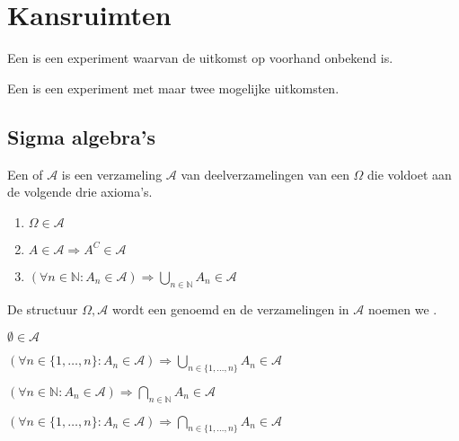 \documentclass[main.tex]{subfiles}
\begin{document}
\chapter{Kansruimten}
\label{cha:kansruimten}

\begin{de}
  Een  is een experiment waarvan de uitkomst op voorhand onbekend is.
\end{de}

\begin{de}
  Een  is een experiment met maar twee mogelijke uitkomsten.
\end{de}
\section{Sigma algebra's}

\begin{de}
  Een  of  $\mathcal{A}$ is een verzameling $\mathcal{A}$ van deelverzamelingen van een  $\Omega$ die voldoet aan de volgende drie axioma's.
  \begin{enumerate}
  \item $\Omega \in \mathcal{A}$
  \item $A\in \mathcal{A} \Rightarrow A^{C} \in \mathcal{A}$
  \item $(\forall n\in \mathbb{N}: A_{n} \in \mathcal{A}) \Rightarrow \bigcup_{n\in \mathbb{N}}A_{n} \in \mathcal{A}$
  \end{enumerate}
  De structuur $\Omega,\mathcal{A}$ wordt een  genoemd en de verzamelingen in $\mathcal{A}$ noemen we .
\end{de}

\begin{st}
  $\emptyset \in \mathcal{A}$
\end{st}

\begin{st}
  $(\forall n\in \{ 1,\dotsc,n \}: A_{n} \in \mathcal{A}) \Rightarrow \bigcup_{n\in \{1,\dotsc,n\}}A_{n} \in \mathcal{A}$
\end{st}

\begin{st}
  $(\forall n\in \mathbb{N}: A_{n} \in \mathcal{A}) \Rightarrow \bigcap_{n\in \mathbb{N}}A_{n} \in \mathcal{A}$
\end{st}

\begin{st}
  $(\forall n\in \{ 1,\dotsc,n \}: A_{n} \in \mathcal{A}) \Rightarrow \bigcap_{n\in \{1,\dotsc,n\}}A_{n} \in \mathcal{A}$
\end{st}
\end{document}
